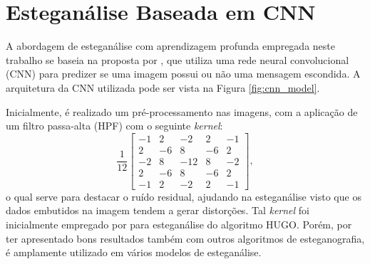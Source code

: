 


 
	
\section{Esteganálise Baseada em CNN}

A abordagem de esteganálise com aprendizagem profunda empregada neste trabalho se baseia na proposta por , que utiliza uma rede neural convolucional (CNN) para predizer se uma imagem possui ou não uma mensagem escondida. A arquitetura da CNN utilizada pode ser vista na Figura \ref{fig:cnn_model}.

Inicialmente, é realizado um pré-processamento nas imagens, com a aplicação de um filtro passa-alta (HPF) com o seguinte \textit{kernel}:
	$$ \frac{1}{12}\left[
    \begin{array}{ccccc}
    -1 & 2 & -2 & 2 & -1 \\
    2 & -6 & 8 & -6 & 2 \\
    -2 & 8 & -12 & 8 & -2 \\
    2 & -6 & 8 & -6 & 2 \\
    -1 & 2 & -2 & 2 & -1
    \end{array}
    \right], $$ 
o qual serve para destacar o ruído residual, ajudando na esteganálise visto que os dados embutidos na imagem tendem a gerar distorções. Tal \textit{kernel} foi inicialmente empregado por  para esteganálise do algoritmo HUGO. Porém, por ter apresentado bons resultados também com outros algoritmos de esteganografia, é amplamente utilizado em vários modelos de esteganálise.

